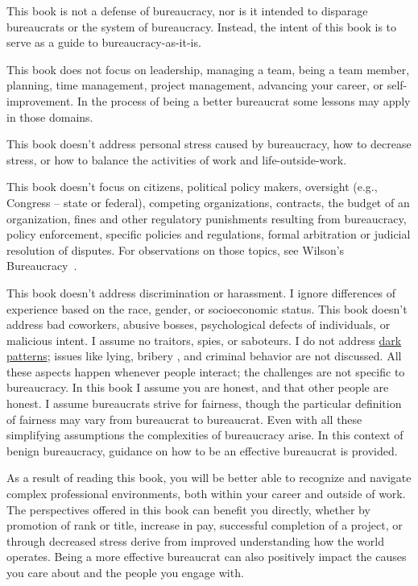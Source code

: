 This book is not a defense of bureaucracy, nor is it intended to disparage bureaucrats or the system of bureaucracy. Instead, the intent of this book is to serve as a guide to bureaucracy-as-it-is. 

This book does not focus on leadership, managing a team, being a team member, planning, time management, project management, advancing your career, or self-improvement. In the process of being a better bureaucrat some lessons may apply in those domains.

This book doesn't address personal stress caused by bureaucracy, how to decrease stress, or how to balance the activities of work and life-outside-work. 


This book doesn't focus on citizens, political policy makers, oversight (e.g., Congress -- state or federal), competing organizations, contracts, the budget of an organization, fines and other regulatory punishments resulting from bureaucracy, policy enforcement, specific policies and regulations, formal arbitration or judicial resolution of disputes. For observations on those topics, see Wilson's Bureaucracy~\cite{1991_Wilson}.

This book doesn't address discrimination or harassment. I ignore differences of experience based on the race, gender, or socioeconomic status. This book doesn't address bad coworkers, abusive bosses, psychological defects of individuals, or malicious intent. I assume no traitors, spies, or saboteurs. I do not address \href{https://en.wikipedia.org/wiki/Dark_pattern}{dark patterns}; issues like lying, bribery \cite{2021_Ang}, and criminal behavior are not discussed. All these aspects happen whenever people interact; the challenges are not specific to bureaucracy. In this book I assume you are honest, and that other people are honest.  
I assume bureaucrats strive for fairness, though the particular definition of fairness may vary from bureaucrat to bureaucrat. 
Even with all these simplifying assumptions the complexities of bureaucracy arise. In this context of benign bureaucracy, guidance on how to be an effective bureaucrat is provided.


As a result of reading this book, you will be better able to recognize and navigate complex professional environments, both within your career and outside of work. The perspectives offered in this book can benefit you directly, whether by promotion of rank or title, increase in pay, successful completion of a project, or through decreased stress derive from improved understanding how the world operates. Being a more effective bureaucrat can also positively impact the causes you care about and the people you engage with.

